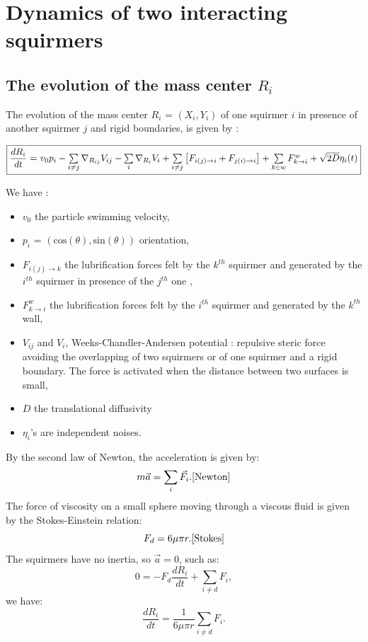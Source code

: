 \documentclass{article}
\begin{document}
\section{Dynamics of two interacting squirmers}
\subsection{The evolution of the mass center $R_i$}
The evolution of the mass center $R_i$ = $(X_i, Y_i)$ of one squirmer $i$ in presence of 
another squirmer $j$ and rigid boundaries, is given by :
\begin{center}
$\boxed{\frac{dR_i}{dt}$ = $v_0 p_i -  \sum\limits_{i \ne j}\nabla_{R_{ij}} V_{ij} - \sum\limits_{i}\nabla_{R_i} V_i + \sum\limits_{i\ne j}\left[F_{i(j)\rightarrow i} + F_{j(i)\rightarrow i}\right]+ \sum\limits_{k \in w}F_{k\rightarrow i}^w + \sqrt{2D}\eta_i(t)}$
\end{center}
We have : \begin{itemize}
    \item $v_0$ the particle swimming velocity,
    \item $p_i$ = $(\mathrm{cos}(\theta),\mathrm{sin}(\theta))$ orientation,
    \item $F_{i(j)\rightarrow k}$ the lubrification forces felt by the $k^{th}$ squirmer and generated by the $i^{th}$ squirmer in presence of the $j^{th}$ one \cite{Brumley},
    \item $F^w_{k\rightarrow i}$ the lubrification forces felt by the $i^{th}$ squirmer and generated by the $k^{th}$ wall\cite{Brumley},
    \item $V_{ij}$ and $V_i$, Weeks-Chandler-Andersen potential : repulsive steric force avoiding the overlapping of two squirmers or of one squirmer and a rigid boundary. The force is activated when the distance between two surfaces is small,
    \item $D$ the translational diffusivity
    \item $\eta_i$'s are independent noises. 
\end{itemize} 
\vspace{0,5cm}
By the second law of Newton, the acceleration is given by:
$$m\vec{a} = \sum\limits_i \vec{F}_i.\cite{Newton}$$
The force of viscosity on a small sphere moving through a viscous fluid is given by the Stokes-Einstein relation:
$$F_d = 6\mu\pi r.\cite{Stokes}$$
The squirmers have no inertia, so $\vec{a} = 0$, such as:
$$0 = -F_d\frac{dR_i}{dt} + \sum\limits_{i \ne d} F_i,$$
we have:
$$\frac{dR_i}{dt} = \frac{1}{6\mu\pi r}\sum\limits_{i \ne d} F_i.$$
\end{document}
